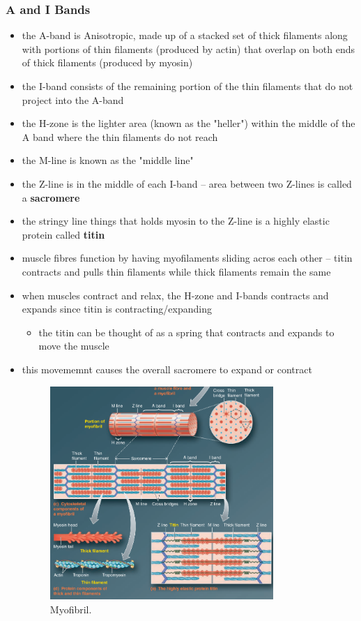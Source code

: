 \documentclass[10pt]{article}
\begin{document}
\subsubsection{A and I Bands}
\begin{itemize}
    \item the A-band is Anisotropic, made up of a stacked set of thick filaments along with portions of thin filaments (produced by actin) that overlap on both ends of thick filaments (produced by myosin)
    \item the I-band consists of the remaining portion of the thin filaments that do not project into the A-band
    \item the H-zone is the lighter area (known as the "heller") within the middle of the A band where the thin filaments do not reach
    \item the M-line is known as the "middle line"
    \item the Z-line is in the middle of each I-band -- area between two Z-lines is called a \textbf{sacromere} 
    \item the stringy line things that holds myosin to the Z-line is a highly elastic protein called \textbf{titin} 
    \item muscle fibres function by having myofilaments sliding acros each other -- titin contracts and pulls thin filaments while thick filaments remain the same
    \item when muscles contract and relax, the H-zone and I-bands contracts and expands since titin is contracting/expanding
        \begin{itemize}
            \item the titin can be thought of as a spring that contracts and expands to move the muscle 
        \end{itemize}
    \item this movememnt causes the overall sacromere to expand or contract
        \begin{figure}[h]
            \centering
            \includegraphics[width=0.8\textwidth]{myofibril}
            \caption{Myofibril.}
            \label{fig:myofibril}
        \end{figure}
\end{itemize}
\end{document}
